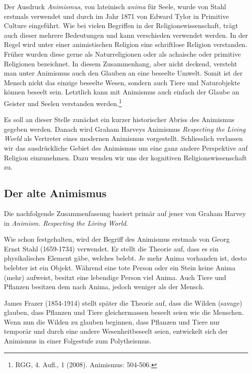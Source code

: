 Der Ausdruck \emph{Animismus}, von lateinisch \emph{anima} für Seele, wurde von Stahl erstmals verwendet und durch im Jahr 1871 von Edward Tylor in Primitive Culture eingeführt. Wie bei vielen Begriffen in der Religionswissenschaft, trägt auch dieser mehrere Bedeutungen und kann verschieden verwendet werden. In der Regel wird unter einer animistischen Religion eine schriftlose Religion verstanden. Früher wurden diese gerne als Naturreligionen oder als achaische oder primitive Religionen bezeichnet. In diesem Zusammenhang, aber nicht deckend, versteht man unter Animismus auch den Glauben an eine beseelte Umwelt. Somit ist der Mensch nicht das einzige beseelte Wesen, sondern auch Tiere und Naturobjekte können beseelt sein. Letztlich kann mit Animismus auch einfach der Glaube an Geister und Seelen verstanden werden.\footnote{RGG, 4. Aufl., 1 (2008). Animismus: 504-506.}

Es soll an dieser Stelle zunächst ein kurzer historischer Abriss des Animismus gegeben werden. Danach wird Graham Harveys Animismus \emph{Respecting the Living World} als Vertreter eines modernen Animismus vorgestellt. Schliesslich verlassen wir das ausdrückliche Gebiet des Animismus um eine ganz andere Perspektive auf Religion einzunehmen. Dazu wenden wir uns der kognitiven Religionswissenschaft zu. 

\subsection{Der alte Animismus}
Die nachfolgende Zusammenfassung basiert primär auf jener von Graham Harvey in \emph{Animism. Respecting the Living World}. 

Wie schon festgehalten, wird der Begriff des Animismus erstmals von Georg Ernst Stahl (1659-1734) verwendet. Er stellt die Theorie auf, dass es ein physikalisches Element gäbe, welches belebt. Je mehr Anima vorhanden ist, desto belebter ist ein Objekt. Während eine tote Person oder ein Stein keine Anima (mehr) aufweist, besitzt eine lebendige Person viel Anima. Auch Tiere und Pflanzen besitzen dem nach Anima, jedoch weniger als der Mensch.

James Frazer (1854-1914) stellt später die Theorie auf, dass die Wilden (savage) glauben, dass Pflanzen und Tiere gleichermassen beseelt seien wie die Menschen. Wenn nun die Wilden zu glauben beginnen, dass Pflanzen und Tiere nur temporär und durch eine andere Wesenheitbeseelt seien, entwickelt sich der Animismus in einer Folgestufe zum Polytheismus.

